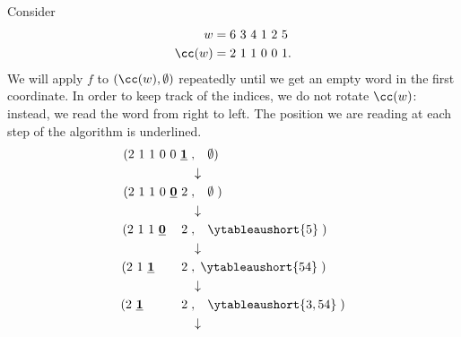 \begin{ex}\label{ex: cat alg}
    Consider \begin{align*}
        w &=  6 \ 3 \ 4  \ 1 \ 2\ 5  \\ 
        \cc(w) &=  2 \ 1 \ 1 \ 0 \ 0 \ 1 .
    \end{align*}
    We will apply $f$ to $(\cc(w),\emptyset)$ repeatedly until we get an empty word in the first coordinate.
In order to keep track of the indices, we do not rotate $\cc(w)$: instead, we read the word from right to left. The position we are reading at each step of the algorithm is underlined. 
     {\allowdisplaybreaks\begin{align*}
          ( 2 \ 1 \ 1 \ 0 \ 0 \ \mathbf{\underline{1}} \hspace{.1cm}&, \hspace{.3cm} \emptyset) \\ &\downarrow\\ 
     ( 2 \ 1 \ 1 \ 0 \ \mathbf{\underline{0}} \ 2\hspace{.1cm} &, \hspace{.3cm}\emptyset \hspace{.1cm}) \\ &\downarrow\\ 
     ( 2 \ 1 \ 1 \  \mathbf{\underline{0}} \ \hspace{.2cm} \ 2 \hspace{.1cm}&, \hspace{.3cm} \ytableaushort{5} \hspace{.1cm}) 
      \\ &\downarrow\\ 
     ( 2 \ 1 \ \mathbf{\underline{1}} \  \hspace{.2cm} \ \hspace{.2cm} \ 2 \hspace{.1cm}&,\hspace{.1cm} \ytableaushort{54}\hspace{.1cm}) \\ &\downarrow\\ 
     ( 2 \ \mathbf{\underline{1}} \  \hspace{.2cm}  \  \hspace{.2cm} \ \hspace{.2cm} \ 2\hspace{.1cm} &, \hspace{.3cm}\ytableaushort{3,54}\hspace{.1cm}) 
      \\ &\downarrow\\ 

\end{align*}}
\end{ex}
